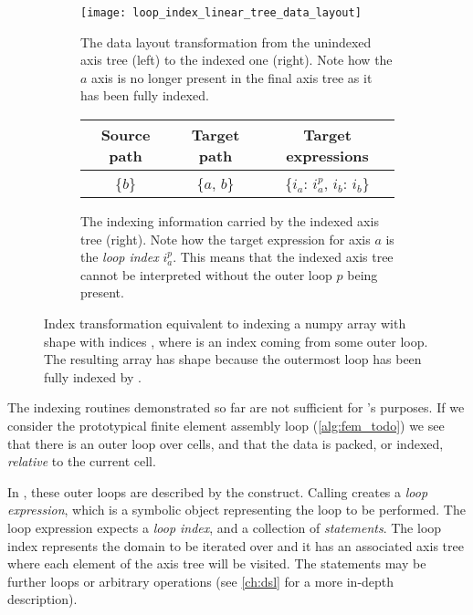 \documentclass[thesis]{subfiles}
\begin{document}
\begin{figure}
  \centering
  \begin{subfigure}{\textwidth}
    \centering
    \texttt{[image: loop\_index\_linear\_tree\_data\_layout]}
    \caption{
      The data layout transformation from the unindexed axis tree (left) to the indexed one (right).
      Note how the $a$ axis is no longer present in the final axis tree as it has been fully indexed.
    }
    \label{fig:loop_index_linear_tree_data_layout}
  \end{subfigure}

  \vspace{1em}

  \begin{subfigure}{\textwidth}
    \centering
    \begin{tabular}{|c|c|c|}
      \hline
      \textbf{Source path} & \textbf{Target path} & \textbf{Target expressions} \\
      \hline
      \{$b$\} & \{$a$, $b$\} & \{$i_a$: $i^p_a$, $i_b$: $i_b$\} \\
      \hline
    \end{tabular}
    \caption{
      The indexing information carried by the indexed axis tree (right).
      Note how the target expression for axis $a$ is the \textit{loop index} $i^p_a$.
      This means that the indexed axis tree cannot be interpreted without the outer loop $p$ being present.
    }
    \label{fig:loop_index_linear_tree_data_layout_exprs}
  \end{subfigure}

  \caption{
    Index transformation equivalent to indexing a numpy array with shape  with indices \pycode{[p, ::]}, where  is an index coming from some outer loop.
    The resulting array has shape  because the outermost loop has been fully indexed by .
  }
  \label{fig:loop_index_linear_tree_data_layout_all}
\end{figure}

The indexing routines demonstrated so far are not sufficient for 's purposes.
If we consider the prototypical finite element assembly loop (\cref{alg:fem_todo}) we see that there is an outer loop over cells, and that the data is packed, or indexed, \textit{relative} to the current cell.

In , these outer loops are described by the  construct.
Calling  creates a \textit{loop expression}, which is a symbolic object representing the loop to be performed.
The loop expression expects a \textit{loop index}, and a collection of \textit{statements}.
The loop index represents the domain to be iterated over and it has an associated axis tree where each element of the axis tree will be visited.
The statements may be further loops or arbitrary operations (see \cref{ch:dsl} for a more in-depth description).
\end{document}
